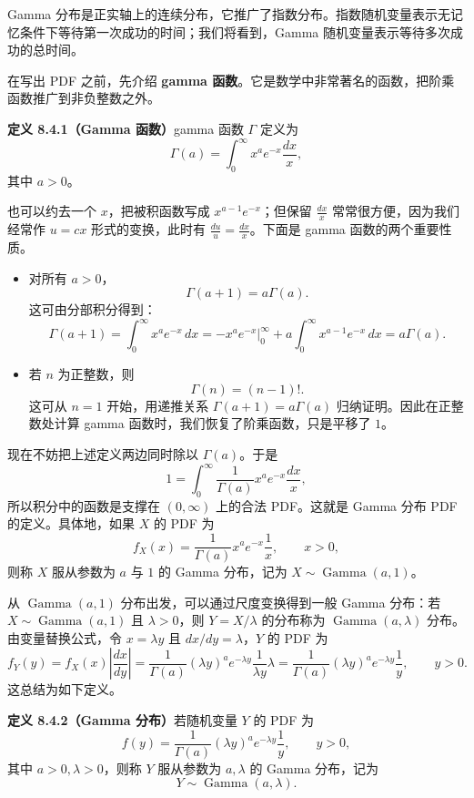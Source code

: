 \documentclass[UTF8, 12pt, fontset=fandol, oneside]{ctexart}
\begin{document}
Gamma 分布是正实轴上的连续分布，它推广了指数分布。指数随机变量表示无记忆条件下等待第一次成功的时间；我们将看到，Gamma 随机变量表示等待多次成功的总时间。

在写出 PDF 之前，先介绍 \textbf{gamma 函数}。它是数学中非常著名的函数，把阶乘函数推广到非负整数之外。

\noindent\textbf{定义 8.4.1（Gamma 函数）}\quad gamma 函数 $\Gamma$ 定义为
\[
  \Gamma(a)=\int_0^\infty x^a e^{-x}\frac{dx}{x},
\]
其中 $a>0$。

也可以约去一个 $x$，把被积函数写成 $x^{a-1}e^{-x}$；但保留 $\frac{dx}{x}$ 常常很方便，因为我们经常作 $u=cx$ 形式的变换，此时有 $\frac{du}{u}=\frac{dx}{x}$。下面是 gamma 函数的两个重要性质。

\begin{itemize}
  \item 对所有 $a>0$，
  \[
    \Gamma(a+1)=a\Gamma(a).
  \]
  这可由分部积分得到：
  \[
    \Gamma(a+1)=\int_0^\infty x^a e^{-x}\,dx
    =-x^a e^{-x}\bigg|_0^\infty
    +a\int_0^\infty x^{a-1}e^{-x}\,dx
    =a\Gamma(a).
  \]

  \item 若 $n$ 为正整数，则
  \[
    \Gamma(n)=(n-1)!.
  \]
  这可从 $n=1$ 开始，用递推关系 $\Gamma(a+1)=a\Gamma(a)$ 归纳证明。因此在正整数处计算 gamma 函数时，我们恢复了阶乘函数，只是平移了 $1$。
\end{itemize}

现在不妨把上述定义两边同时除以 $\Gamma(a)$。于是
\[
  1=\int_0^\infty \frac{1}{\Gamma(a)}x^ae^{-x}\frac{dx}{x},
\]
所以积分中的函数是支撑在 $(0,\infty)$ 上的合法 PDF。这就是 Gamma 分布 PDF 的定义。具体地，如果 $X$ 的 PDF 为
\[
  f_X(x)=\frac{1}{\Gamma(a)}x^ae^{-x}\frac1x,\qquad x>0,
\]
则称 $X$ 服从参数为 $a$ 与 $1$ 的 Gamma 分布，记为 $X\sim\operatorname{Gamma}(a,1)$。

从 $\operatorname{Gamma}(a,1)$ 分布出发，可以通过尺度变换得到一般 Gamma 分布：若 $X\sim\operatorname{Gamma}(a,1)$ 且 $\lambda>0$，则 $Y=X/\lambda$ 的分布称为 $\operatorname{Gamma}(a,\lambda)$ 分布。由变量替换公式，令 $x=\lambda y$ 且 $dx/dy=\lambda$，$Y$ 的 PDF 为
\[
  f_Y(y)=f_X(x)\left|\frac{dx}{dy}\right|
  =\frac{1}{\Gamma(a)}(\lambda y)^a e^{-\lambda y}\frac{1}{\lambda y}\lambda
  =\frac{1}{\Gamma(a)}(\lambda y)^a e^{-\lambda y}\frac1y,\qquad y>0.
\]
这总结为如下定义。

\noindent\textbf{定义 8.4.2（Gamma 分布）}\quad 若随机变量 $Y$ 的 PDF 为
\[
  f(y)=\frac{1}{\Gamma(a)}(\lambda y)^a e^{-\lambda y}\frac1y,\qquad y>0,
\]
其中 $a>0,\lambda>0$，则称 $Y$ 服从参数为 $a,\lambda$ 的 Gamma 分布，记为
\[
  Y\sim\operatorname{Gamma}(a,\lambda).
\]
\end{document}
